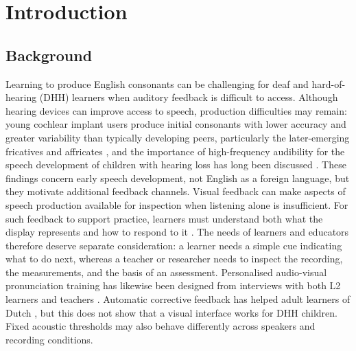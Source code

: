 \documentclass[engproc,article,submit,moreauthors]{Definitions/mdpi}
\begin{document}
\section{Introduction}
\subsection{Background}
Learning to produce English consonants can be challenging for deaf and hard-of-hearing (DHH) learners when auditory feedback is difficult to access. Although hearing devices can improve access to speech, production difficulties may remain: young cochlear implant users produce initial consonants with lower accuracy and greater variability than typically developing peers, particularly the later-emerging fricatives and affricates \cite{ertmer2011}, and the importance of high-frequency audibility for the speech development of children with hearing loss has long been discussed \cite{stelmachowicz2004}. These findings concern early speech development, not English as a foreign language, but they motivate additional feedback channels. Visual feedback can make aspects of speech production available for inspection when listening alone is insufficient. For such feedback to support practice, learners must understand both what the display represents and how to respond to it \cite{hitchcock2023}. The needs of learners and educators therefore deserve separate consideration: a learner needs a simple cue indicating what to do next, whereas a teacher or researcher needs to inspect the recording, the measurements, and the basis of an assessment. Personalised audio-visual pronunciation training has likewise been designed from interviews with both L2 learners and teachers \cite{bu2021}. Automatic corrective feedback has helped adult learners of Dutch \cite{neri2006}, but this does not show that a visual interface works for DHH children. Fixed acoustic thresholds may also behave differently across speakers and recording conditions.
\end{document}
